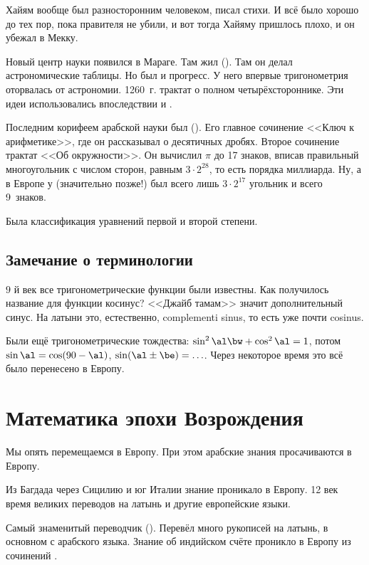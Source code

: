 \documentclass[a4paper,oneside,fleqn,10pt]{article}
\begin{document}
Хайям вообще был разносторонним человеком, писал стихи.
И всё было хорошо до тех пор, пока правителя не убили, и вот тогда
Хайяму пришлось плохо, и он убежал в Мекку.

Новый центр науки появился в Мараге. Там жил  ().
Там он делал астрономические таблицы.
Но был и прогресс. У него впервые тригонометрия оторвалась от астрономии.
1260~г. трактат о полном четырёхстороннике.
Эти идеи использовались впоследствии  и .

Последним корифеем арабской науки был  ().
Его главное сочинение <<Ключ к арифметике>>, где он рассказывал о десятичных дробях.
Второе сочинение трактат <<Об окружности>>. Он вычислил $\pi$ до 17 знаков, вписав
правильный многоугольник с числом сторон, равным $3\cdot 2^{28}$, то есть порядка миллиарда.
Ну, а в Европе у  (значительно позже!) был всего лишь $3\cdot 2^{17}$ угольник и всего 9~знаков.

Была классификация уравнений первой и второй степени.

\subsection{Замечание о терминологии}

$9$ й век все тригонометрические функции
были известны. Как получилось название для функции косинус?
<<Джайб тамам>> значит дополнительный
синус. На латыни это, естественно, complementi sinus, то есть
уже почти cosinus.

Были ещё тригонометрические тождества:
$\sin^2 \al \bw+ \cos^2\al = 1$, потом $\sin \al = \cos(90-\al)$, $\sin({\al \pm\be}) = \ldots$.
Через некоторое время это всё было перенесено в Европу.


\section{Математика эпохи Возрождения}

Мы опять перемещаемся в Европу. При этом арабские знания просачиваются в Европу.

Из Багдада через Сицилию и юг Италии знание проникало в Европу.
12 век время великих переводов на латынь и другие европейские языки.

Самый знаменитый переводчик  ().
Перевёл много рукописей на латынь, в основном с арабского языка.
Знание об индийском счёте проникло в Европу из сочинений .
\end{document}
